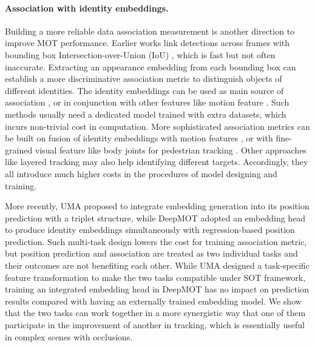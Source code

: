 \documentclass[final]{cvpr}
\begin{document}
\paragraph{Association with identity embeddings.}
Building a more reliable data association measurement is another direction to improve MOT performance. Earlier works link detections across frames with bounding box Intersection-over-Union (IoU) \cite{Bewley2016, Bochinski2017, Sheng2018a,Wang_CVIU_2014}, which is fast but not often inaccurate. Extracting an appearance embedding from each bounding box can establish a more discriminative association metric to distinguish objects of different identities. The identity embeddings can be used as main source of association \cite{Wojke2017, Chen2018}, or in conjunction with other features like motion feature \cite{Schulter2017, Wang2017, Sadeghian2017}. Such methods usually need a dedicated model trained with extra datasets, which incurs non-trivial cost in computation. More sophisticated association metrics can be built on fusion of identity embeddings with motion features \cite{Xiang2018, Chu2019, Yin2020}, or with fine-grained visual feature like body joints for pedestrian tracking \cite{Tang2017, Henschel2019}. Other approaches like layered tracking \cite{CongxiaDai2006, Bandouch2009, Chang2013} may also help identifying different targets. Accordingly, they all introduce much higher costs in the procedures of model designing and training.

More recently, UMA \cite{Yin2020} proposed to integrate embedding generation into its position prediction with a triplet structure, while DeepMOT \cite{Xu2020a} adopted an embedding head to produce identity embeddings simultaneously with regression-based position prediction. Such multi-task design lowers the cost for training association metric, but position prediction and association are treated as two individual tasks and their outcomes are not benefiting each other. While UMA \cite{Yin2020} designed a task-specific feature transformation to make the two tasks compatible under SOT framework, training an integrated embedding head in DeepMOT \cite{Xu2020a} has no impact on prediction results compared with having an externally trained embedding model. We show that the two tasks can work together in a more synergistic way that one of them participate in the improvement of another in tracking, which is essentially useful in complex scenes with occlusions.
\end{document}
